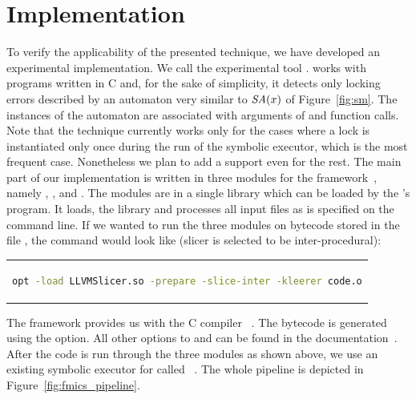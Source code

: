 \section{Implementation} \label{sec:fmics_impl}
To verify the applicability of the presented technique, we have developed an
experimental implementation. We call the experimental tool \symbio. \symbio
works with programs written in C and, for the sake of simplicity, it detects
only locking errors described by an automaton very similar to ${\textit{SA}}(x)$ of
Figure~\ref{fig:sm}. The instances of the automaton are associated with
arguments of  and  function calls. Note that the
technique currently works only for the cases where a lock is instantiated only
once during the run of the symbolic executor, which is the most frequent case.
Nonetheless we plan to add a support even for the rest. The main part of our
implementation is written in three modules for the \llvm
framework~\cite{llvm}, namely , , and
. The modules are in a single library which can be loaded by the
\llvm's  program. It loads, the library and processes all input
files as is specified on the command line. If we wanted to run the three
modules on \llvm bytecode stored in the file , the command would
look like (slicer is selected to be inter-procedural):
\begin{center}
\begin{tabular}{c} {
\begin{lstlisting}[language=bash, numbers=none, frame=none,
	columns=fullflexible]
opt -load LLVMSlicer.so -prepare -slice-inter -kleerer code.o
\end{lstlisting} }
\end{tabular}
\end{center}

The \llvm framework provides us with the C compiler \clang~\cite{clang}. The
\llvm bytecode is generated using the  option. All other
options to \clang and  can be found in the \llvm
documentation~\cite{llvm}. After the code is run through the three modules as
shown above, we use an existing symbolic executor for \llvm called
\klee~\cite{klee}. The whole pipeline is depicted in
Figure~\ref{fig:fmics_pipeline}.

